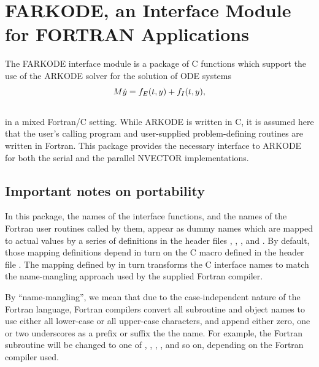 \documentclass[letterpaper,10pt,english]{sphinxmanual}
\begin{document}
\chapter{FARKODE, an Interface Module for FORTRAN Applications}
\label{f_interface/index:farkode-an-interface-module-for-fortran-applications}\label{f_interface/index:fortraninterface}\label{f_interface/index::doc}
The FARKODE interface module is a package of C functions which
support the use of the ARKODE solver for the solution of ODE
systems
\begin{gather}
\begin{split}M \dot{y} = f_E(t,y) + f_I(t,y),\end{split}\notag\\\begin{split}\end{split}\notag
\end{gather}
in a mixed Fortran/C setting.  While ARKODE is written in C, it is
assumed here that the user's calling program and user-supplied
problem-defining routines are written in Fortran. This package
provides the necessary interface to ARKODE for both the serial and
the parallel NVECTOR implementations.


\section{Important notes on portability}
\label{f_interface/index:important-notes-on-portability}\label{f_interface/index:finterface-portability}
In this package, the names of the interface functions, and the names
of the Fortran user routines called by them, appear as dummy names
which are mapped to actual values by a series of definitions in the
header files , , , and
.  By default, those mapping definitions depend in turn
on the C macro  defined in the header file
.  The mapping defined by  in turn
transforms the C interface names to match the name-mangling approach
used by the supplied Fortran compiler.

By ``name-mangling'', we mean that due to the case-independent nature of
the Fortran language, Fortran compilers convert all subroutine and
object names to use either all lower-case or all upper-case
characters, and append either zero, one or two underscores as a prefix
or suffix the the name.  For example, the Fortran subroutine
 will be changed to one of ,
, , , and so on,
depending on the Fortran compiler used.
\end{document}
